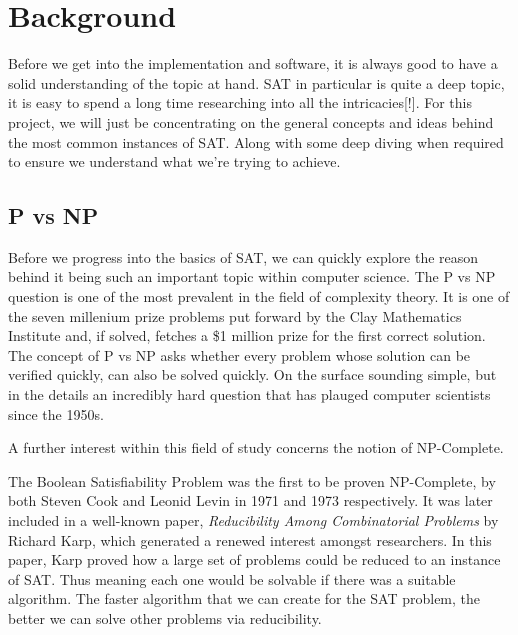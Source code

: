 \documentclass{article}
\begin{document}

\section{Background}
Before we get into the implementation and software, it is always good to have a solid understanding
of the topic at hand. SAT in particular is quite a deep topic, it is easy to spend a long time
researching into all the intricacies[!]. For this project, we will just be concentrating on the
general concepts and ideas behind the most common instances of SAT. Along with some deep diving when required to ensure we
understand what we're trying to achieve.


\subsection{P vs NP}
Before we progress into the basics of SAT, we can quickly explore the reason behind it being such an
important topic within computer science. The P vs NP question is one of the most prevalent in the
field of complexity theory. It is one of the seven millenium prize problems put forward by the Clay
Mathematics Institute and, if solved, fetches a \$1 million prize for the first correct solution.
The concept of P vs NP asks whether every problem whose solution can be verified quickly, can also
be solved quickly. On the surface sounding simple, but in the details an incredibly hard question
that has plauged computer scientists since the 1950s.

A further interest within this field of study concerns the notion of NP-Complete.

The Boolean Satisfiability Problem was the first to be proven NP-Complete, by both Steven Cook and
Leonid Levin in 1971 and 1973 respectively\cite{scook}\cite{levin}. It was later included in a
well-known paper, \textit{Reducibility Among Combinatorial Problems} by Richard Karp\cite{karp},
which generated a renewed interest amongst researchers. In this paper, Karp proved how a large
set of problems could be reduced to an instance of SAT. Thus meaning each one would be solvable if
there was a suitable algorithm. The faster algorithm that we can create for the SAT problem, the
better we can solve other problems via reducibility.
\end{document}
